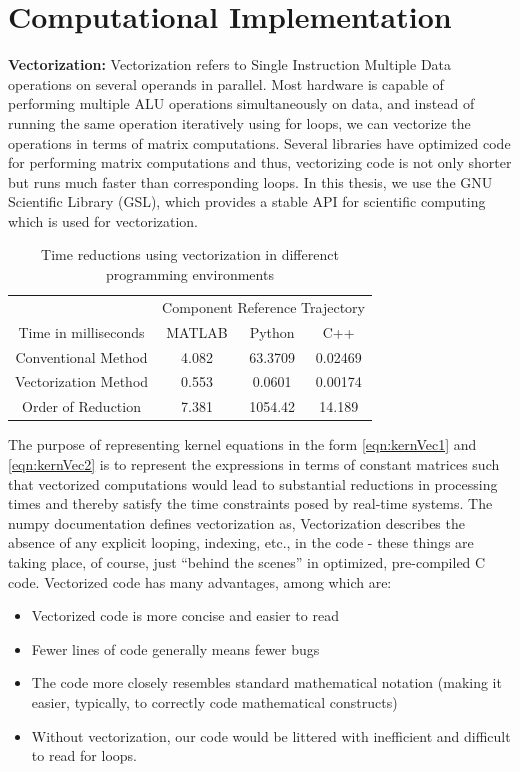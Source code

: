 \documentclass[letterpaper%
, twoside%
, 12pt%
,memoire%
, english%
,creativecommons,hyperref%
]{thETS}
\begin{document}
\section{Computational Implementation}
\textbf{Vectorization:} Vectorization refers to Single Instruction Multiple Data operations on several operands in parallel. Most hardware is capable of performing multiple ALU operations simultaneously on data, and instead of running the same operation iteratively using for loops, we can vectorize the operations in terms of matrix computations. Several libraries have optimized code for performing matrix computations and thus, vectorizing code is not only shorter but runs much faster than corresponding loops. In this thesis, we use the GNU Scientific Library (GSL), which provides a stable API for scientific computing which is used for vectorization.
\begin{table}
\parbox{0.65\textwidth}{\caption{Time reductions using vectorization in differenct programming environments}\label{Tab:vect}}
\begin{tabular}{|c|c|c|c|}
\hline
         & \multicolumn{3}{c|}{Component Reference Trajectory}\\\cline{2-4} 
Time in milliseconds &   MATLAB   &  Python &   C++ \\ \hline
Conventional Method  & 4.082 & 63.3709 & 0.02469    \\
Vectorization Method & 0.553 & 0.0601  & 0.00174    \\
Order of Reduction   & 7.381 & 1054.42 & 14.189     \\
\hline
\end{tabular}
\end{table}
The purpose of representing kernel equations in the form \eqref{eqn:kernVec1} and \eqref{eqn:kernVec2} is to represent the expressions in terms of constant matrices such that vectorized computations would lead to substantial reductions in processing times and thereby satisfy the time constraints posed by real-time systems. The numpy documentation \citep{oliphant2006guide} defines vectorization as, Vectorization describes the absence of any explicit looping, indexing, etc., in the code - these things are taking place, of course, just “behind the scenes” in optimized, pre-compiled C code. Vectorized code has many advantages, among which are:
\begin{itemize}
\item Vectorized code is more concise and easier to read
\item Fewer lines of code generally means fewer bugs
\item The code more closely resembles standard mathematical notation (making it easier, typically, to correctly code mathematical constructs)
\item Without vectorization, our code would be littered with inefficient and difficult to read for loops.
\end{itemize}
\end{document}
